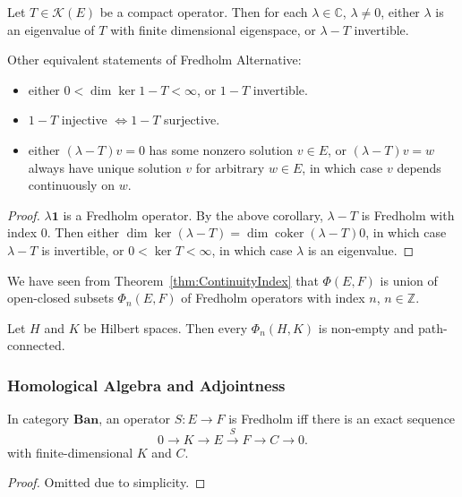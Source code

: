 \begin{theorem}
	\label{thm:FredholmAlternative}
	Let $T \in \mathcal{K}(E)$ be a compact operator. Then for each $\lambda \in \mathbb{C}$, $\lambda\neq 0$, either $\lambda$ is an eigenvalue of $T$ with finite dimensional eigenspace, or $\lambda - T$ invertible.
\end{theorem}

Other equivalent statements of Fredholm Alternative:
\begin{itemize}
	\item 
	either $0 < \operatorname{dim} \operatorname{ker} 1 - T < \infty $, or $1 - T$ invertible. 
	\item $1 - T$ injective $\iff  1 - T $ surjective.
	\item either $(\lambda - T) v = 0$ has some nonzero solution $v \in E$, or $(\lambda - T) v = w$ always have unique solution $v$ for arbitrary  $w \in E$, in which case $v$ depends continuously on $w$.
\end{itemize}

\begin{proof}
	$\lambda \mathbf{1}$ is a Fredholm operator. By the above corollary, $\lambda - T$ is Fredholm with index $0$. Then either $\operatorname{dim} \operatorname{ker} (\lambda - T) = \operatorname{dim} \operatorname{coker} (\lambda - T) 0$, in which case $\lambda - T$ is invertible, or $0 < \operatorname{ker} T < \infty $, in which case $\lambda$ is an eigenvalue.
\end{proof}

We have seen from Theorem~\ref{thm:ContinuityIndex} that $\Phi(E, F)$ is union of open-closed subsets $\Phi_n(E, F)$ of Fredholm operators with index $n$, $n \in \mathbb{Z}$.

\begin{theorem}[Atiyah]
	\label{thm:AtiyahFredConnected}
	Let $H$ and $K$ be Hilbert spaces. Then every $\Phi_n(H, K)$ is non-empty and path-connected.
\end{theorem}

\subsubsection{Homological Algebra and Adjointness}

\begin{proposition}
	\label{prop:FredholmExactSequence}
	In category $\mathbf{Ban}$, an operator $S: E \to F$ is Fredholm iff there is an exact sequence
	\[
		0 \to K \to E \xrightarrow{S} F \to C \to 0
	.\] 
	with finite-dimensional $K$ and $C$.
\end{proposition}
\begin{proof}
	Omitted due to simplicity.
\end{proof}


